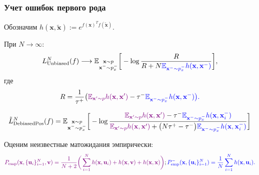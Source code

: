 \documentclass[
	11pt, %
	t, %
        russian
]{beamer}
\begin{document}
\begin{frame}
    \frametitle{Учет ошибок первого рода}
\scriptsize
Обозначим $h(\textbf{x}, \widetilde{\textbf{x}}) := e^{f(\textbf{x})^T f(\widetilde{\textbf{x}})}$.

\begin{lemma}
При $N \to \infty$:
\begin{equation*}
L_{\text{Unbiased}}^N(f) 
\longrightarrow
\mathbb{E}_{\substack{\textbf{x} \sim p \\ \textbf{x}^- \sim p_x^-}} \bigg[ - \log \frac{R}{R + N \color{blue} \mathbb{E}_{\textbf{x}^- \sim p_x^-} h(\textbf{x}, \textbf{x}^-)}\bigg],
\end{equation*}
где
\begin{equation*}
R = \frac{1}{\tau^+} \big(\color{violet} \mathbb{E}_{\textbf{x}' \sim p} h(\textbf{x}, \textbf{x}') \color{black}  - \tau^- \color{blue} \mathbb{E}_{\textbf{x}^- \sim p_x^-} h(\textbf{x}, \textbf{x}^-)\big).
\end{equation*}
\end{lemma}

\begin{equation*}
\tilde{L}_{\text{DebiasedPos}}^N (f) = \mathbb{E}_{\substack{\textbf{x} \sim p \\ \textbf{x}^- \sim p_x^-}} \bigg[ - \log \frac{\color{violet} \mathbb{E}_{\textbf{x}' \sim p} h(\textbf{x}, \textbf{x}') \color{black} - \tau^- \color{blue} \mathbb{E}_{\textbf{x}^- \sim p_x^-} h(\textbf{x}, \textbf{x}_i^-)}{\color{violet} \mathbb{E}_{\textbf{x}' \sim p} h(\textbf{x}, \textbf{x}') \color{black} + \big(N \tau^+ - \tau^-\big) \color{blue} \mathbb{E}_{\textbf{x}^- \sim p_x^-} h(\textbf{x}, \textbf{x}_i^-)}\bigg]
\end{equation*}

Оценим неизвестные матожидания эмпирически:
\begin{equation*}
\color{violet}P_{\text{emp}} (\textbf{x}, \{\textbf{u}_i\}_{i=1}^N, \textbf{v}) = \frac{1}{N+2} \bigg(\sum \limits_{i=1}^N h(\textbf{x}, \textbf{u}_i) + h(\textbf{x}, \textbf{v}) + h(\textbf{x}, \textbf{x})\bigg)\color{black}; \color{blue} P_{\text{emp}}^- (\textbf{x}, \{\textbf{u}_i\}_{i=1}^N) = \frac{1}{N} \sum \limits_{i=1}^N h(\textbf{x}, \textbf{u}_i).
\end{equation*}

\end{frame}
\end{document}
